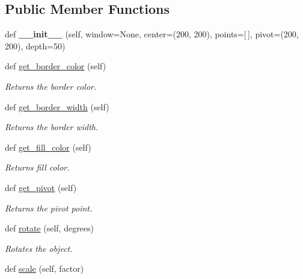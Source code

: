 \subsection*{Public Member Functions}
\begin{DoxyCompactItemize}
\item 
\mbox{\label{classcs110graphics__v2_1_1Fillable_a989f90dbdca59e46f375cd08681cd37c}} 
def {\bfseries \+\_\+\+\_\+init\+\_\+\+\_\+} (self, window=None, center=(200, 200), points=\mbox{[}$\,$\mbox{]}, pivot=(200, 200), depth=50)
\item 
def \mbox{\hyperlink{classcs110graphics__v2_1_1Fillable_a7814c409d4cdf9c6c006bb12a64c9e90}{get\+\_\+border\+\_\+color}} (self)
\begin{DoxyCompactList}\small\item\em Returns the border color. \end{DoxyCompactList}\item 
def \mbox{\hyperlink{classcs110graphics__v2_1_1Fillable_a7e9e8b8996fba870bf9bc4eacd5be6aa}{get\+\_\+border\+\_\+width}} (self)
\begin{DoxyCompactList}\small\item\em Returns the border width. \end{DoxyCompactList}\item 
def \mbox{\hyperlink{classcs110graphics__v2_1_1Fillable_abc6f79dd754321c041f4befeb37e21f0}{get\+\_\+fill\+\_\+color}} (self)
\begin{DoxyCompactList}\small\item\em Returns fill color. \end{DoxyCompactList}\item 
def \mbox{\hyperlink{classcs110graphics__v2_1_1Fillable_a098238caa8fec93e7510bd271f7813a5}{get\+\_\+pivot}} (self)
\begin{DoxyCompactList}\small\item\em Returns the pivot point. \end{DoxyCompactList}\item 
def \mbox{\hyperlink{classcs110graphics__v2_1_1Fillable_aee03142975056e9f3cbd5b7b5f81bcb7}{rotate}} (self, degrees)
\begin{DoxyCompactList}\small\item\em Rotates the object. \end{DoxyCompactList}\item 
def \mbox{\hyperlink{classcs110graphics__v2_1_1Fillable_af023a8511e9e9149214a3bf8e3a50aae}{scale}} (self, factor)

\end{DoxyCompactItemize}
